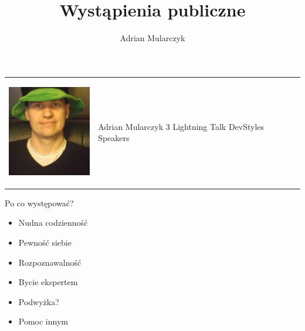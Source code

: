 \documentclass{beamer}
\title[]
{Wystąpienia publiczne}
\author[Adrian Mularczyk]{Adrian Mularczyk}
\institute[PGS Softwarei]
{
PGS Software
}
\date{}
\begin{document}
\begin{frame}
  \titlepage 
\end{frame}

\begin{frame}{}
	\begin{tabular}{ p{4cm} p{6cm} }
		\begin{minipage}{.4\textwidth}
			\begin{center}
  				\includegraphics[height=4cm]{ja.png}
			\end{center}
   		 \end{minipage}
   		 &
		\begin{minipage}{.7\textwidth}
  					\Huge{Adrian Mularczyk} \newline \newline
					\Large{3 Lightning Talk} \newline \newline
					\Large{DevStyles Speakers}
   		 \end{minipage}
	\end{tabular}
\end{frame}

\begin{frame}{}
	\begin{center}
		\Huge{Po co występować?}
	\end{center}
\end{frame}

\begin{frame}{}
	\begin{Large}
		\begin{itemize}
			\item Nudna codzienność
			\item Pewność siebie
			\item Rozpoznawalność
			\item Bycie ekspertem
			\item Podwyżka?
			\item Pomoc innym	
		\end{itemize}
	\end{Large}
\end{frame}
\end{document}

